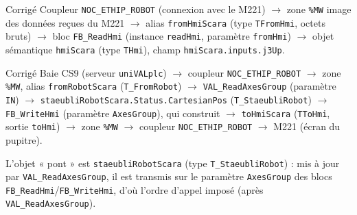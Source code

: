 \begin{UPSTIactivite}

\begin{UPSTIcorrectionP}{Corrigé}
Coupleur \texttt{NOC\_ETHIP\_ROBOT} (connexion avec le M221) $\to$ zone
\texttt{\%MW} image des données reçues du M221 $\to$ alias
\texttt{fromHmiScara} (type \texttt{TFromHmi}, octets bruts) $\to$ bloc
\texttt{FB\_ReadHmi} (instance \texttt{readHmi}, paramètre
\texttt{fromHmi}) $\to$ objet sémantique \texttt{hmiScara} (type
\texttt{THmi}), champ \texttt{hmiScara.inputs.j3Up}.
\end{UPSTIcorrectionP}


\begin{UPSTIcorrectionP}{Corrigé}
Baie CS9 (serveur \texttt{uniVALplc}) $\to$ coupleur
\texttt{NOC\_ETHIP\_ROBOT} $\to$ zone \texttt{\%MW}, alias
\texttt{fromRobotScara} (\texttt{T\_FromRobot}) $\to$
\texttt{VAL\_ReadAxesGroup} (paramètre \texttt{IN}) $\to$
\texttt{staeubliRobotScara.Status.CartesianPos} (\texttt{T\_StaeubliRobot})
$\to$ \texttt{FB\_WriteHmi} (paramètre \texttt{AxesGroup}), qui construit
$\to$ \texttt{toHmiScara} (\texttt{TToHmi}, sortie \texttt{toHmi}) $\to$
zone \texttt{\%MW} $\to$ coupleur \texttt{NOC\_ETHIP\_ROBOT} $\to$ M221
(écran du pupitre).

L'objet « pont » est \texttt{staeubliRobotScara} (type
\texttt{T\_StaeubliRobot}) : mis à jour par \texttt{VAL\_ReadAxesGroup}, il
est transmis sur le paramètre \texttt{AxesGroup} des blocs
\texttt{FB\_ReadHmi}/\texttt{FB\_WriteHmi}, d'où l'ordre d'appel imposé
(après \texttt{VAL\_ReadAxesGroup}).
\end{UPSTIcorrectionP}
\end{UPSTIactivite}
